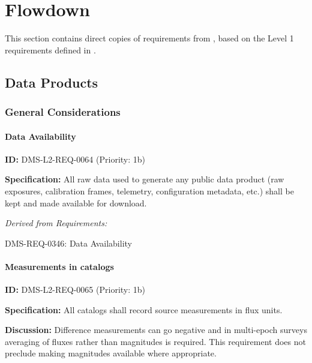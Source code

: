\documentclass[SE,toc,lsstdraft]{lsstdoc}
\date{2018-01-19}
\begin{document}
\maketitle

\section{ Flowdown}

This section contains direct copies of requirements from , based on the Level 1 requirements defined in .

\subsection{Data Products}

\subsubsection{General Considerations}

\paragraph{Data Availability}\hfill  %

\label{DMS-L2-REQ-0064}
\textbf{ID:} DMS-L2-REQ-0064 (Priority: 1b)

\textbf{Specification: }All raw data used to generate any public data product (raw exposures, calibration frames, telemetry, configuration metadata, etc.) shall be kept and made available for download.

\emph{Derived from Requirements:}

DMS-REQ-0346:
Data Availability \newline

\paragraph{Measurements in catalogs}\hfill  %

\label{DMS-L2-REQ-0065}
\textbf{ID:} DMS-L2-REQ-0065 (Priority: 1b)

\textbf{Specification: }All catalogs shall record source measurements in flux units.

\textbf{Discussion: }Difference measurements can go negative and in multi-epoch surveys averaging of fluxes rather than magnitudes is required. This requirement does not preclude making magnitudes available where appropriate.
\end{document}
